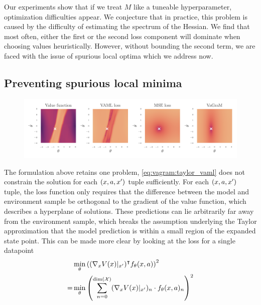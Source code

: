 Our experiments show that if we treat $M$ like a tuneable hyperparameter, optimization difficulties appear.
We conjecture that in practice, this problem is caused by the difficulty of estimating the spectrum of the Hessian.
We find that most often, either the first or the second loss component will dominate when choosing values heuristically.
However, without bounding the second term, we are faced with the issue of spurious local optima which we address now.


\subsection{Preventing spurious local minima}
\begin{figure}[!t]
\centering
    \includegraphics[clip, trim=0.cm 0.5cm 0.cm 0.45cm, width=\textwidth]{figures/vagram/all_losses.pdf}
    \caption{}
    \label{fig:vagram:all_losses}
\end{figure}


The formulation above retains one problem, \autoref{eq:vagram:taylor_vaml} does not constrain the solution for each $(x,a,x')$ tuple sufficiently.
For each $(x,a,x')$ tuple, the loss function only requires that the difference between the model and environment sample be orthogonal to the gradient of the value function, which describes a hyperplane of solutions.
These predictions can lie arbitrarily far away from the environment sample, which breaks the assumption underlying the Taylor approximation that the model prediction is within a small region of the expanded state point.
This can be made more clear by looking at the loss for a single datapoint
\begin{align}
    &\min_\theta \left((\nabla_x V(x)|_{x'})^\intercal f_\theta(x,a) \right) ^2\\
    =&\min_\theta \left(\sum_{n=0}^{\text{dim}(\mathcal{X})} (\nabla_x V(x)|_{x'})_n \cdot f_\theta(x,a)_n\right)^2
\end{align}

